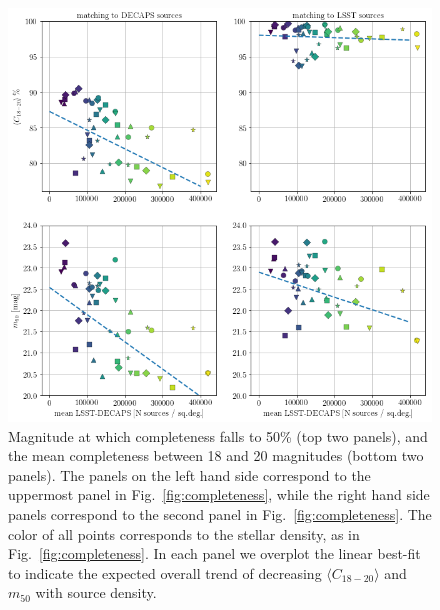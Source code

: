 \documentclass[DM,lsstdraft,toc,usenatbib]{lsstdoc}
\begin{document}
\begin{figure}
\begin{centering}
\includegraphics[width=0.96\columnwidth]{figs/decaps_lsst_c1820_m50.png}
\caption{Magnitude at which completeness falls to 50\% (top two panels), and the mean completeness between 18 and 20 magnitudes (bottom two panels).  The panels on the left hand side correspond to the uppermost panel in Fig.~\ref{fig:completeness}, while the right hand side panels correspond to the second panel in Fig.~\ref{fig:completeness}. The color of all points corresponds to the stellar density, as in Fig.~\ref{fig:completeness}. In each panel we overplot the linear best-fit to indicate the expected overall trend of decreasing $\langle C_{18-20} \rangle$ and  $m_{50}$ with source density. }
\label{fig:completeness_characterize}
\end{centering}
\end{figure} 
\end{document}
